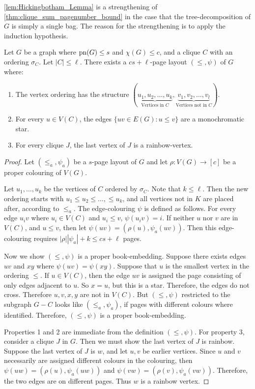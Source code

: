 \cref{lem:Hickingbotham_Lemma} is a strengthening of \cref{thm:clique_sum_pagenumber_bound} in the case that the tree-decomposition of $G$ is simply a single bag. The reason for the strengthening is to apply the induction hypothesis.
\begin{lemma}\label{lem:Hickingbotham_Lemma}
	Let \(G\) be a graph where \(\operatorname{pn}(G) \leq s\) and \(\chi(G) \leq c\), and a clique \(C\) with an ordering \(\sigma_C\). Let \(|C| \leq \ell\). There exists a \(cs + \ell\)-page layout \((\leq, \psi)\) of \(G\) where:
	\begin{enumerate}
		\item The vertex ordering has the structure \((\underbrace{u_1, u_2, \ldots, u_k}_{\text{Vertices in } C}, \underbrace{v_1, v_2, \ldots, v_l}_{\text{Vertices not in }C})\).
		\item For every \(u \in V(C)\), the edges \(\lbrace uv \in E(G) : u \leq v \rbrace\) are a monochromatic star.
		\item For every clique \(J\), the last vertex of \(J\) is a rainbow-vertex.
	\end{enumerate}
\end{lemma}
\begin{proof}
	Let \((\leq_a, \psi_a)\) be a \(s\)-page layout of \(G\) and let \(\rho: V(G) \rightarrow [c]\) be a proper colouring of \(V(G)\).

	Let \(u_1, \ldots, u_k\) be the vertices of \(C\) ordered by \(\sigma_C\). Note that \(k \leq \ell\). Then the new ordering starts with \(u_1 \leq u_2 \leq \ldots, \leq u_k\), and all vertices not in \(K\) are placed after, according to \(\leq_a\).
	The edge-colouring \(\psi\) is defined as follows. For every edge \(u_i v\) where \(u_i \in V(C)\) and \(u_i \leq v\), \(\psi(u_i v) = i\). If neither \(u\) nor \(v\) are in \(V(C)\), and \(u \leq v\), then let \(\psi(uv) = (\rho(u), \psi_a(uv))\). Then this edge-colouring requires \(|\rho| |\psi_a| + k \leq cs + \ell\) pages.

	Now we show \((\leq, \psi)\) is a proper book-embedding. Suppose there exists edges \(uv\) and \(xy\) where \(\psi(uv) = \psi(xy)\). Suppose that \(u\) is the smallest vertex in the ordering \(\leq\). If \(u \in V(C)\), then the edge \(uv\) is assigned the page consisting of only edges adjacent to $u$. So \(x = u\), but this is a star. Therefore, the edges do not cross. Therefore \(u, v, x, y\) are not in \(V(C)\). But \((\leq, \psi)\) restricted to the subgraph $G - C$ looks like \((\leq_a, \psi_a)\), if pages with different colours where identified. Therefore, \((\leq, \psi)\) is a proper book-embedding.  
	\par
	Properties 1 and 2 are immediate from the definition \((\leq, \psi)\). For property 3, consider a clique \(J\) in \(G\). Then we must show the last vertex of \(J\) is rainbow. Suppose the last vertex of \(J\) is \(w\), and let \(u, v\) be earlier vertices. Since \(u\) and \(v\) necessarily are assigned different colours in the colouring, then \(\psi(uw) = (\rho(u), \psi_a(uw))\) and \(\psi(vw) = (\rho(v), \psi_a(vw))\). Therefore, the two edges are on different pages. Thus \(w\) is a rainbow vertex.
\end{proof}

